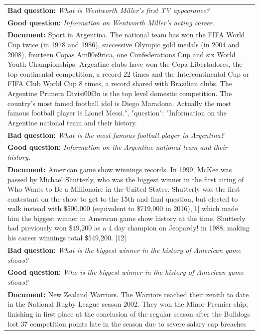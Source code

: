 \documentclass[11pt]{article}
\begin{document}
\begin{table}[htbp!]
\begin{small}
\begin{tabularx}{\textwidth}{X}
\textbf{\textcolor{orng}{Bad question:}} \textit{What is Wentworth Miller's first TV appearance?}  \\ 
\textbf{\textcolor{rd}{Good question:}}  \textit{Information on Wentworth Miller's acting career.}  \\
\midrule
\textbf{\textcolor{blu}{Document:}} {\footnotesize Sport in Argentina. The national team has won the FIFA World Cup twice (in 1978 and 1986), successive Olympic gold medals (in 2004 and 2008), fourteen Copas Am\u00e9rica, one Confederations Cup and six World Youth Championships. Argentine clubs have won the Copa Libertadores, the top continental competition, a record 22 times and the Intercontinental Cup or FIFA Club World Cup 8 times, a record shared with Brazilian clubs. The Argentine Primera Divisi\u00f3n is the top level domestic competition. The country's most famed football idol is Diego Maradona. Actually the most famous football player is Lionel Messi.", "question": "Information on the Argentine national team and their history.} \\
\textbf{\textcolor{orng}{Bad question:}} \textit{What is the most famous football player in Argentina?}  \\ 
\textbf{\textcolor{rd}{Good question:}}  \textit{Information on the Argentine national team and their history.}  \\
\midrule
\textbf{\textcolor{blu}{Document:}} {\footnotesize American game show winnings records. In 1999, McKee was passed by Michael Shutterly, who was the biggest winner in the first airing of Who Wants to Be a Millionaire in the United States. Shutterly was the first contestant on the show to get to the 15th and final question, but elected to walk instead with \$500,000 (equivalent to \$719,000 in 2016),[1] which made him the biggest winner in American game show history at the time. Shutterly had previously won \$49,200 as a 4 day champion on Jeopardy! in 1988, making his career winnings total \$549,200. [12]} \\
\textbf{\textcolor{orng}{Bad question:}} \textit{What is the biggest winner in the history of American game shows?}  \\ 
\textbf{\textcolor{rd}{Good question:}}  \textit{Who is the biggest winner in the history of American game shows?}  \\
\midrule
\textbf{\textcolor{blu}{Document:}} {\footnotesize New Zealand Warriors. The Warriors reached their zenith to date in the National Rugby League season 2002. They won the Minor Premier
ship, finishing in first place at the conclusion of the regular season after the Bulldogs lost 37 competition points late in the season due to severe salary cap breaches
}
\end{tabularx}
\end{small}
\end{table}
\end{document}

